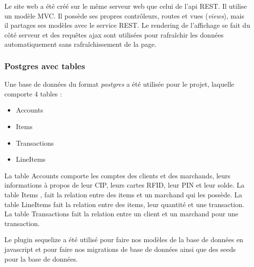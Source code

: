 		Le site web a été créé sur le même serveur web que celui de l’api REST. Il utilise un modèle MVC. Il possède ses propres contrôleurs, routes et vues (\emph{views}), mais il partages ses modèles avec le service REST. Le \og rendering \fg{} de l’affichage se fait du côté serveur et des requêtes ajax sont utilisées pour rafraîchir les données automatiquement sans rafraîchissement de la page.
		
		\subsubsection{Postgres avec tables}
		Une base de données du format \emph{postgres} a été utilisée pour le projet, laquelle comporte 4 tables : 
		\begin{itemize}
			\item Accounts
			\item Items
			\item Transactions
			\item LineItems
		\end{itemize}

		La table \og Accounts \fg{} comporte les comptes des clients et des marchands, leurs informations à propos de leur CIP, leurs cartes RFID, leur PIN et leur solde. La table \og Items \fg{}, fait la relation entre des items et un marchand qui les possède. La table \og LineItems \fg{} fait la relation entre des items, leur quantité et une transaction. La table \og Transactions \fg{} fait la relation entre un client et un marchand pour une transaction.

		Le plugin \og sequelize \fg{} a été utilisé pour faire nos modèles de la base de données en javascript et pour faire nos migrations de base de données ainsi que des \og seeds \fg{} pour la base de données.

		
		
		